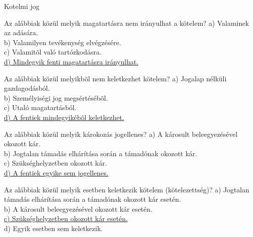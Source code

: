 \begin{frame}[plain]
\begin{tcolorbox}[center, colback={myyellow}, coltext={black}, colframe={myyellow}]
    { Kotelmi jog}\\
\end{tcolorbox}
\end{frame}

\begin{frame}

\begin{tcolorbox}[title={130. Kérdés}]
Az alábbiak közül melyik magatartásra nem irányulhat a kötelem?
\tcblower
a) Valaminek az adására.\\
b) Valamilyen tevékenység elvégzésére.\\
c) Valamitõl való tartózkodásra.\\
\uline {d) Mindegyik fenti magatartásra irányulhat.}
\end{tcolorbox}

\begin{tcolorbox}[title={131. Kérdés}]
Az alábbiak közül melyikbõl nem keletkezhet kötelem?
\tcblower
a) Jogalap nélküli gazdagodásból.\\
b) Személyiségi jog megsértésébõl.\\
c) Utaló magatartásból.\\
\uline {d) A fentiek mindegyikébõl keletkezhet.}
\end{tcolorbox}

\begin{tcolorbox}[title={132. Kérdés}]
Az alábbiak közül melyik károkozás jogellenes?
\tcblower
a) A károsult beleegyezésével okozott kár.\\
b) Jogtalan támadás elhárítása során a támadónak okozott kár.\\
c) Szükséghelyzetben okozott kár.\\
\uline {d) A fentiek egyike sem jogellenes.}
\end{tcolorbox}

\begin{tcolorbox}[title={133. Kérdés}]
Az alábbiak közül melyik esetben keletkezik kötelem (kötelezettség)?
\tcblower
a) Jogtalan támadás elhárítása során a támadónak okozott kár esetén.\\
b) A károsult beleegyezésével okozott kár esetén.\\
\uline {c) Szükséghelyzetben okozott kár esetén.}\\
d) Egyik esetben sem keletkezik.
\end{tcolorbox}

\end{frame}


